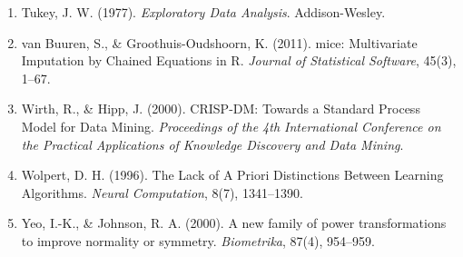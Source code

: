 \begin{enumerate}
    \item Tukey, J. W. (1977). \textit{Exploratory Data Analysis}. Addison-Wesley.
    \item van Buuren, S., \& Groothuis-Oudshoorn, K. (2011). mice: Multivariate Imputation by Chained Equations in R. \textit{Journal of Statistical Software}, 45(3), 1--67.
    \item Wirth, R., \& Hipp, J. (2000). CRISP-DM: Towards a Standard Process Model for Data Mining. \textit{Proceedings of the 4th International Conference on the Practical Applications of Knowledge Discovery and Data Mining}.
    \item Wolpert, D. H. (1996). The Lack of A Priori Distinctions Between Learning Algorithms. \textit{Neural Computation}, 8(7), 1341--1390.
    \item Yeo, I.-K., \& Johnson, R. A. (2000). A new family of power transformations to improve normality or symmetry. \textit{Biometrika}, 87(4), 954--959.
\end{enumerate}
